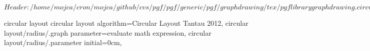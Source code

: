 %
%
%

\ProvidesFileRCS[v\pgfversion] $Header: /home/mojca/cron/mojca/github/cvs/pgf/pgf/generic/pgf/graphdrawing/tex/pgflibrarygraphdrawing.circular.code.tex,v 1.1 2012/04/16 13:23:56 tantau Exp $



%
%
\pgfgddeclarealgorithmkey
  {circular layout}
  {circular layout}
  {
    algorithm=Circular Layout Tantau 2012,
    circular layout/radius/.graph parameter=evaluate math expression,
    circular layout/radius/.parameter initial=0cm,
  }



\endinput